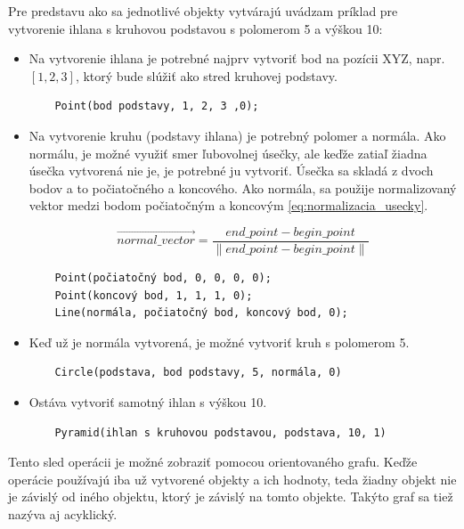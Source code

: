 Pre predstavu ako sa jednotlivé objekty vytvárajú uvádzam príklad pre vytvorenie ihlana s kruhovou podstavou s polomerom 5 a výškou 10:
\begin{itemize}
    \item Na vytvorenie ihlana je potrebné najprv vytvoriť bod na pozícii XYZ, napr. $\left [ 1, 2, 3 \right ]$, ktorý bude slúžiť ako stred kruhovej podstavy.
	\begin{lstlisting}
	Point(bod podstavy, 1, 2, 3 ,0);
	\end{lstlisting}
	\item Na vytvorenie kruhu (podstavy ihlana) je potrebný polomer a normála. Ako normálu, je možné využiť smer ľubovolnej úsečky, ale keďže zatiaľ žiadna úsečka vytvorená nie je, je potrebné ju vytvoriť. Úsečka sa skladá z dvoch bodov a to počiatočného a koncového. Ako normála, sa použije normalizovaný vektor medzi bodom počiatočným a koncovým \ref{eq:normalizacia_usecky}.

	\begin{equation}
		\overrightarrow{normal\_vector}=
		\frac{end\_point - begin\_point}{
		\left \|  end\_point - begin\_point \right \|}
	\label{eq:normalizacia_usecky}
	\end{equation}

	\begin{lstlisting}
	Point(počiatočný bod, 0, 0, 0, 0);
	Point(koncový bod, 1, 1, 1, 0);
	Line(normála, počiatočný bod, koncový bod, 0);
	\end{lstlisting}
	\item Keď už je normála vytvorená, je možné vytvoriť kruh s polomerom 5.
	\begin{lstlisting}
	Circle(podstava, bod podstavy, 5, normála, 0) 
	\end{lstlisting}
	\item Ostáva vytvoriť samotný ihlan s výškou 10.
	\begin{lstlisting}
	Pyramid(ihlan s kruhovou podstavou, podstava, 10, 1)
	\end{lstlisting}
\end{itemize}


Tento sled operácii je možné zobraziť pomocou orientovaného grafu. Keďže operácie používajú iba už vytvorené objekty a ich hodnoty, teda žiadny objekt nie je závislý od iného objektu, ktorý je závislý na tomto objekte. Takýto graf sa tiež nazýva aj acyklický. 























